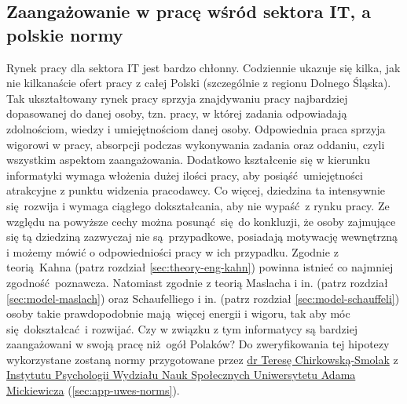 \subsection{Zaangażowanie w pracę wśród sektora IT, a polskie normy}
Rynek pracy dla sektora IT jest bardzo chłonny. Codziennie ukazuje się kilka, jak nie kilkanaście ofert pracy z całej Polski (szczególnie z regionu Dolnego Śląska). Tak ukształtowany rynek pracy sprzyja znajdywaniu pracy najbardziej dopasowanej do danej osoby, tzn. pracy, w której zadania odpowiadają zdolnościom, wiedzy i umiejętnościom danej osoby. Odpowiednia praca sprzyja wigorowi w pracy, absorpcji podczas wykonywania zadania oraz oddaniu, czyli wszystkim aspektom zaangażowania. Dodatkowo kształcenie
się w kierunku informatyki wymaga włożenia dużej ilości pracy, aby posiąść umiejętności atrakcyjne z punktu widzenia pracodawcy. Co więcej, dziedzina ta intensywnie się rozwija i wymaga ciągłego dokształcania, aby nie wypaść z rynku pracy. Ze względu na powyższe cechy można posunąć się do konkluzji, że osoby zajmujące się tą dziedziną zazwyczaj nie są przypadkowe, posiadają motywację wewnętrzną i możemy mówić o odpowiedniości pracy w ich przypadku. Zgodnie z teorią Kahna (patrz
rozdział \ref{sec:theory-eng-kahn}) powinna istnieć co najmniej zgodność poznawcza. Natomiast zgodnie z teorią Maslacha i in. (patrz rozdział \ref{sec:model-maslach}) oraz Schaufelliego i in. (patrz rozdział \ref{sec:model-schauffeli}) osoby takie prawdopodobnie mają więcej energii i wigoru, tak aby móc się dokształcać i rozwijać. Czy w związku z tym informatycy są bardziej zaangażowani w swoją pracę
niż ogół Polaków? Do zweryfikowania tej hipotezy wykorzystane zostaną normy przygotowane przez \href{http://www.psychologia.amu.edu.pl/ip-uam/struktura-zatrudnienia-w-instytucie/curriculum-vitae-teresa-chirkowska-smolak/}{dr Teresę Chirkowską-Smolak} z \href{http://www.psychologia.amu.edu.pl/}{Instytutu Psychologii Wydziału Nauk Społecznych Uniwersytetu Adama Mickiewicza} (\ref{sec:app-uwes-norms}). 
